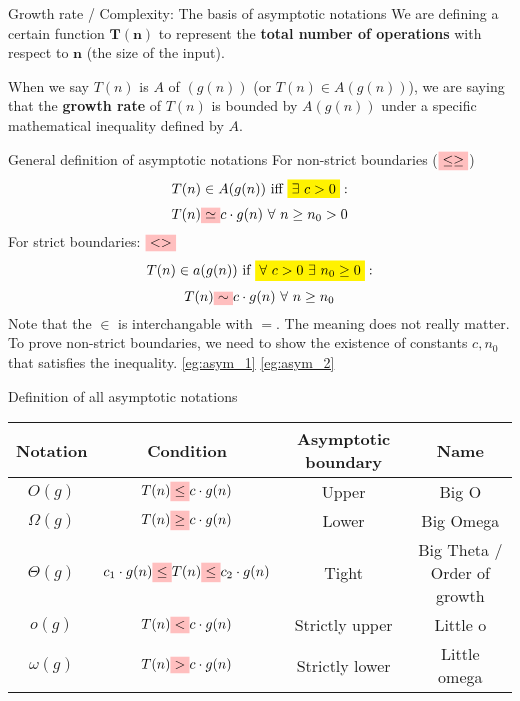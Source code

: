 \begin{theorem}
    {Growth rate / Complexity: The basis of asymptotic notations}
    We are defining a certain function $\mathbf{T(n)}$ to represent the \textbf{total number of operations} with respect to $\mathbf{n}$ (the size of the input).

    When we say $T(n)$ is $A$ of $(g(n))$ (or $T(n)\in A(g(n))$), we are saying that the \textbf{growth rate} of $T(n)$ is bounded by $A(g(n))$ under a specific mathematical inequality defined by $A$.
\end{theorem}

\begin{definition}
    {General definition of asymptotic notations}
    For non-strict boundaries ($\mathcolorbox{pink}{\leq \geq}$)
    \[T(n) \in A(g(n))\ \text{iff}\ \mathcolorbox{yellow}{\exists\ c > 0}:\]
    \[T(n) \mathcolorbox{pink}{\simeq} c\cdot g(n)\ \forall\ n \geq n_0 > 0\]
    For strict boundaries: {$\mathcolorbox{pink}{< >}$}
    \[T(n) \in a(g(n))\ \text{if}\ \mathcolorbox{yellow}{\forall\ c > 0\ \exists\ n_0 \geq 0}:\]
    \[T(n) \mathcolorbox{pink}{\sim} c\cdot g(n)\ \forall\ n \geq n_0\]
    Note that the $\in$ is interchangable with $=$. The meaning does not really matter.
    \tcblower
    To prove non-strict boundaries, we need to show the existence of constants $c, n_0$ that satisfies the inequality.
    \label{def:asym}
    \ref{eg:asym_1} \ref{eg:asym_2}
\end{definition}

\begin{definition}
    {Definition of all asymptotic notations}
    \begin{tabular}{|c|c|c|c|}
        \hline
        \textbf{Notation} & \textbf{Condition}                                                                         & \textbf{Asymptotic boundary} & \textbf{Name}               \\ \hline
        $O(g)$            & $T(n) \mathcolorbox{pink}{\leq} c\cdot g(n)$                                             & Upper                        & Big O                       \\
        $\Omega(g)$       & $T(n) \mathcolorbox{pink}{\geq} c\cdot g(n)$                                             & Lower                        & Big Omega                   \\
        $\Theta(g)$       & $ c_1\cdot g(n)\mathcolorbox{pink}{\leq} T(n) \mathcolorbox{pink}{\leq} c_2\cdot g(n)$ & Tight                        & Big Theta / Order of growth \\
        $o(g)$            & $T(n) \mathcolorbox{pink}{<} c\cdot g(n)$                                                & Strictly upper               & Little o                    \\
        $\omega(g)$       & $T(n) \mathcolorbox{pink}{>} c\cdot g(n)$                                                & Strictly lower               & Little omega                \\ \hline
    \end{tabular}
\end{definition}

